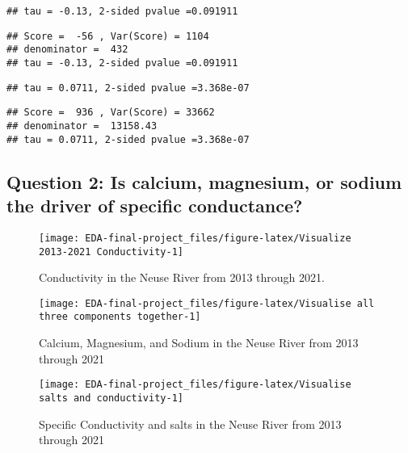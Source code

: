 \documentclass[
  12pt,
]{article}
\begin{document}
\begin{verbatim}
## tau = -0.13, 2-sided pvalue =0.091911
\end{verbatim}

\begin{verbatim}
## Score =  -56 , Var(Score) = 1104
## denominator =  432
## tau = -0.13, 2-sided pvalue =0.091911
\end{verbatim}

\begin{verbatim}
## tau = 0.0711, 2-sided pvalue =3.368e-07
\end{verbatim}

\begin{verbatim}
## Score =  936 , Var(Score) = 33662
## denominator =  13158.43
## tau = 0.0711, 2-sided pvalue =3.368e-07
\end{verbatim}

\hypertarget{question-2-is-calcium-magnesium-or-sodium-the-driver-of-specific-conductance}{%
\subsection{Question 2: Is calcium, magnesium, or sodium the driver of
specific
conductance?}\label{question-2-is-calcium-magnesium-or-sodium-the-driver-of-specific-conductance}}

\begin{figure}

\texttt{[image: EDA-final-project\_files/figure-latex/Visualize 2013-2021 Conductivity-1]} \hfill{}

\caption{Conductivity in the Neuse River from 2013 through 2021.}\label{fig:Visualize 2013-2021 Conductivity}
\end{figure}

\begin{figure}

\texttt{[image: EDA-final-project\_files/figure-latex/Visualise all three components together-1]} \hfill{}

\caption{Calcium, Magnesium, and Sodium in the Neuse River from 2013 through 2021}\label{fig:Visualise all three components together}
\end{figure}

\begin{figure}

\texttt{[image: EDA-final-project\_files/figure-latex/Visualise salts and conductivity-1]} \hfill{}

\caption{Specific Conductivity and salts in the Neuse River from 2013 through 2021}\label{fig:Visualise salts and conductivity}
\end{figure}
\end{document}
